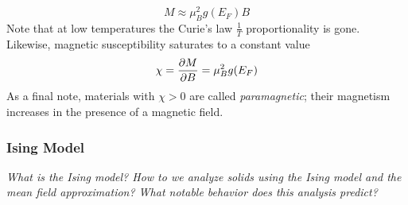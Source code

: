 \documentclass[11pt, a4paper]{article}
\begin{document}
\begin{itemize}
	\begin{equation*}
			M \approx \mu_{B}^{2} g(E_{F}) B
	\end{equation*}
	Note that at low temperatures the Curie's law $ \frac{1}{T} $ proportionality is gone. Likewise, magnetic susceptibility saturates to a constant value
	\begin{equation*}
		\chi = \pdv{M}{B} = \mu_{B}^{2} g(E_{F})
	\end{equation*}
	As a final note, materials with $ \chi > 0 $ are called \textit{paramagnetic}; their magnetism increases in the presence of a magnetic field. 
\end{itemize}

\subsubsection{Ising Model}
\textit{What is the Ising model? How to we analyze solids using the Ising model and the mean field approximation? What notable behavior does this analysis predict?}
\end{document}
